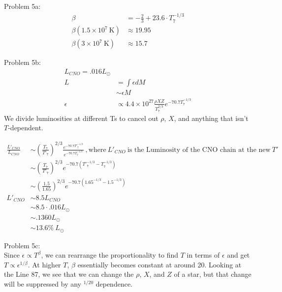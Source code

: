 \documentclass[10pt,a4paper,preprint]{aastex}
\begin{document}
Problem 5a:
\begin{align}
\beta & = -\frac{2}{3} +23.6\cdot T_7^{-1/3}\\
\beta(1.5 \times 10^7~\text{K}) & \approx 19.95\\
\beta(3 \times 10^7~\text{K}) &  \approx 15.7
\end{align}

Problem 5b:
\begin{align}
L_{CNO} = .016L_\odot\\
L &= \int \epsilon dM\\
& \sim \epsilon M\\
\epsilon & \propto 4.4 \times 10^{27} \frac{\rho X Z}{T_7 ^{2/3}} e^{-70.7 T_7^{-1/3}}
\end{align}
We divide luminosities at different Ts to cancel out $\rho$, $X$, and anything that isn't $T$-dependent. 

\begin{align}
\frac{L'_{CNO}}{L_{CNO}} & \sim \left( \frac{T_7}{T'_7} \right)^{2/3} \frac{e^{-70.7 T'_7^{-1/3}}}{e^{-70.7 T_7^{-1/3}}}~,\text{where}~L'_{CNO}~\text{is the Luminosity of the CNO chain at the new} ~T'\\
 & \sim \left( \frac{T_7}{T'_7} \right)^{2/3} e^{-70.7(T'_7 ^{-1/3} - T_7^{-1/3})}\\
 & \sim \left(  \frac{1.5}{1.65} \right)^{2/3} e^{-70.7(1.65 ^{-1/3} - 1.5^{-1/3})}\\
L'_{CNO} & \sim 8.5 L_{CNO}\\
& \sim 8.5\cdot .016L_\odot\\
& \sim .1360 L_\odot\\
& \sim 13.6\% ~L_\odot
\end{align}

Problem 5c:\\
Since $\epsilon \propto T^\beta$, we can rearrange the proportionality to find $T$ in terms of $\epsilon$ and get $T \propto \epsilon^{1/\beta}$. At higher $T$, $\beta$ essentially becomes constant at around 20. Looking at the Line 87, we see that we can change the $\rho$, $X$, and $Z$ of a star, but that change will be suppressed by any $^{1/20}$ dependence. 
\end{document}

